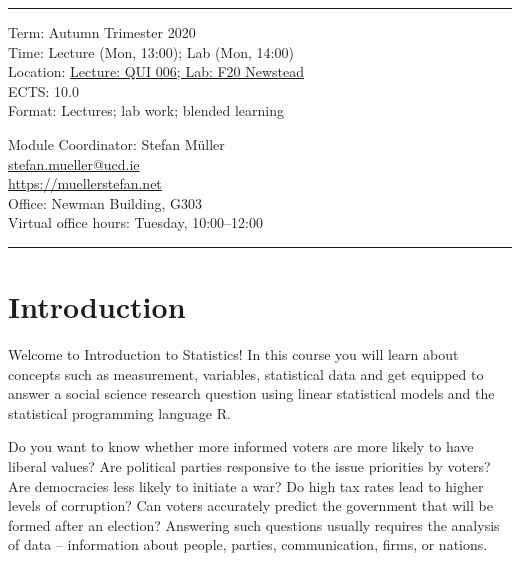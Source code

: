 \documentclass[abstract=on,parskip=full,headings=standardclasses,fontsize=11pt,paper=a4]{scrartcl}
\begin{document}
\vspace{1.5cm}



\hrule
\medskip
\begin{minipage}[t]{0.5\textwidth}
Term: Autumn Trimester 2020 \\
Time: Lecture (Mon, 13:00); Lab (Mon, 14:00) \\
Location:  \href{https://www.ucd.ie/t4cms/UCD%20Student%20Centre.pdf}{Lecture: QUI 006; Lab: F20 Newstead} \\
ECTS: 10.0 \\
Format: Lectures; lab work; blended learning
\end{minipage}
\begin{minipage}[t]{0.49\textwidth}
\begin{flushright}
Module Coordinator: Stefan Müller \\
 \href{mailto:stefan.mueller@ucd.ie}{\textsf{stefan.mueller@ucd.ie}} \\
 \url{https://muellerstefan.net} \\
Office:  Newman Building, G303 \\
Virtual office hours: Tuesday, 10:00--12:00
\end{flushright}
\end{minipage}
\medskip
\hrule 

\section*{Introduction}


Welcome to Introduction to Statistics! In this course you will learn about concepts such as measurement, variables, statistical data and get equipped to answer a social science research question using linear statistical models and the statistical programming language \textsf{R}.

Do you want to know whether more informed voters are more likely to have liberal values? Are political parties responsive to the issue priorities by voters? Are  democracies less likely to initiate a war? Do high tax rates lead to higher levels of corruption? Can voters accurately predict the government that will be formed after an election? Answering such questions usually requires the analysis of data  
-- information about people, parties, communication, firms, or nations.
\end{document}
